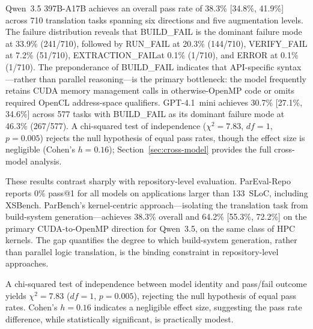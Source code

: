 \documentclass[conference]{IEEEtran}
\newcommand{\buildfail}{\textsc{BUILD\_FAIL}}
\newcommand{\runfail}{\textsc{RUN\_FAIL}}
\newcommand{\verifyfail}{\textsc{VERIFY\_FAIL}}
\newcommand{\extractionfail}{\textsc{EXTRACTION\_FAIL}}
\begin{document}
Qwen~3.5 397B-A17B achieves an overall pass rate of 38.3\% [34.8\%, 41.9\%] across 710 translation tasks spanning six directions and five augmentation levels. The failure distribution reveals that \buildfail{} is the dominant failure mode at 33.9\% (241/710), followed by \runfail{} at 20.3\% (144/710), \verifyfail{} at 7.2\% (51/710), \extractionfail at 0.1\% (1/710), and ERROR at 0.1\% (1/710). The preponderance of \buildfail{} indicates that API-specific syntax---rather than parallel reasoning---is the primary bottleneck: the model frequently retains CUDA memory management calls in otherwise-OpenMP code or omits required OpenCL address-space qualifiers. GPT-4.1~mini achieves 30.7\% [27.1\%, 34.6\%] across 577 tasks with \buildfail{} as its dominant failure mode at 46.3\% (267/577). A chi-squared test of independence ($\chi^2 = 7.83$, $df = 1$, $p = 0.005$) rejects the null hypothesis of equal pass rates, though the effect size is negligible (Cohen's $h = 0.16$); Section~\ref{sec:cross-model} provides the full cross-model analysis. %

These results contrast sharply with repository-level evaluation. ParEval-Repo~\cite{ParEvalRepo2025} reports 0\% pass@1 for all models on applications larger than 133~SLoC, including XSBench. ParBench's kernel-centric approach---isolating the translation task from build-system generation---achieves 38.3\% overall and 64.2\% [55.3\%, 72.2\%] on the primary CUDA-to-OpenMP direction for Qwen~3.5, on the same class of HPC kernels. The gap quantifies the degree to which build-system generation, rather than parallel logic translation, is the binding constraint in repository-level approaches.

A chi-squared test of independence between model identity and pass/fail outcome yields $\chi^2 = 7.83$ ($df = 1$, $p = 0.005$), rejecting the null hypothesis of equal pass rates. Cohen's $h = 0.16$ indicates a negligible effect size, suggesting the pass rate difference, while statistically significant, is practically modest. %
\end{document}
